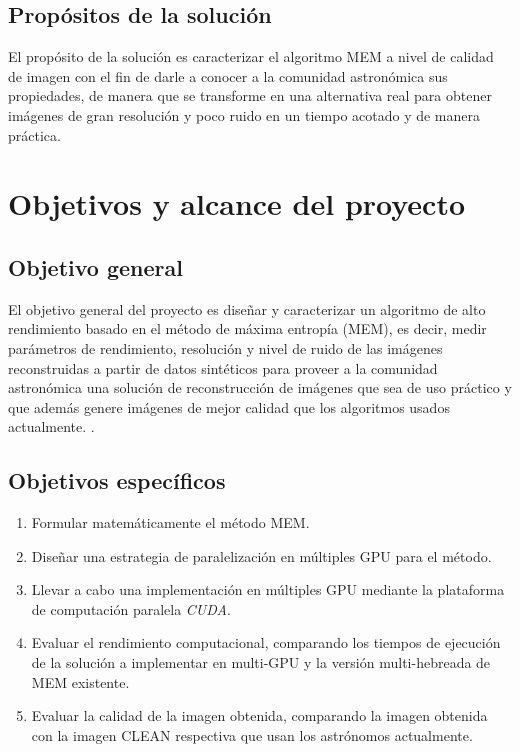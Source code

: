 \subsection{Propósitos de la solución}
El propósito de la solución es caracterizar el algoritmo MEM a nivel de calidad de imagen con el fin de darle a conocer a la comunidad astronómica sus propiedades, de manera que se transforme en una alternativa real para obtener imágenes de gran resolución y poco ruido en un tiempo acotado y de manera práctica.


\section{Objetivos y alcance del proyecto}
\label{intro:objetivos}

\subsection{Objetivo general}
El objetivo general del proyecto es diseñar y caracterizar un algoritmo de alto rendimiento basado en el método de máxima entropía (MEM), es decir, medir parámetros de rendimiento, resolución y nivel de ruido de las imágenes reconstruidas a partir de datos sintéticos para proveer a la comunidad astronómica una solución de reconstrucción de imágenes que sea de uso práctico y que además genere imágenes de mejor calidad que los algoritmos usados actualmente.
.

\subsection{Objetivos espec\'ificos}

\begin{enumerate}
\item Formular matemáticamente el método MEM.
\item Diseñar una estrategia de paralelización en múltiples GPU para el método.
\item Llevar a cabo una implementación en múltiples GPU mediante la plataforma de computación paralela \textit{CUDA}.
\item Evaluar el rendimiento computacional, comparando los tiempos de ejecución de la solución a implementar en multi-GPU y la versión multi-hebreada de MEM existente.
\item Evaluar la calidad de la imagen obtenida, comparando la imagen obtenida con la imagen CLEAN respectiva que usan los astrónomos actualmente.
\end{enumerate}

